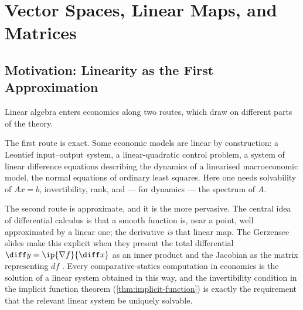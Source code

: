 
\chapter{Vector Spaces, Linear Maps, and Matrices}\label{ch:linear}

\section{Motivation: Linearity as the First Approximation}\label{sec:lin-motivation}

Linear algebra enters economics along two routes, which draw on different parts
of the theory.

The first route is exact. Some economic models are linear by construction: a
Leontief input--output system, a linear-quadratic control problem, a system of
linear difference equations describing the dynamics of a linearised
macroeconomic model, the normal equations of ordinary least squares. Here one
needs solvability of $Ax=b$, invertibility, rank, and --- for dynamics --- the
spectrum of $A$.

The second route is approximate, and it is the more pervasive. The central idea
of differential calculus is that a smooth function is, near a point, well
approximated by a linear one; the derivative \emph{is} that linear map. The
Gerzensee slides make this explicit when they present the total differential
$\diff y=\ip{\nabla f}{\diff x}$ as an inner product and the Jacobian as the matrix
representing $df$ \autocite[slides 10--15]{fukuda2026analysis}. Every
comparative-statics computation in economics is the solution of a linear system
obtained in this way, and the invertibility condition in the implicit function
theorem (\autoref{thm:implicit-function}) is exactly the requirement that the
relevant linear system be uniquely solvable.

